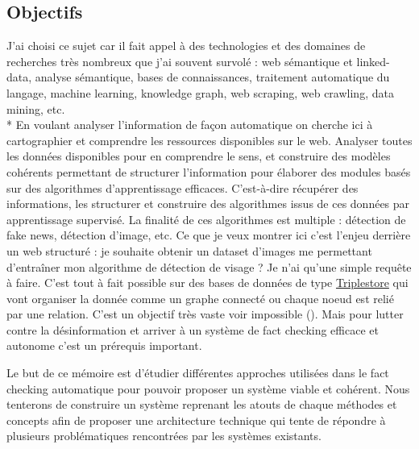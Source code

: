 \subsection{Objectifs}


J'ai choisi ce sujet car il fait appel à des technologies et des domaines de recherches très nombreux que j'ai souvent survolé : web sémantique et linked-data, analyse sémantique, bases de connaissances, traitement automatique du langage, machine learning, knowledge graph, web scraping, web crawling, data mining, etc. 
\\*
En voulant analyser l'information de façon automatique on cherche ici à cartographier et comprendre les ressources disponibles sur le web. Analyser toutes les données disponibles pour en comprendre le sens, et construire des modèles cohérents permettant de structurer l'information pour élaborer des modules basés sur des algorithmes d'apprentissage efficaces. C'est-à-dire récupérer des informations, les structurer et construire des algorithmes issus de ces données par apprentissage supervisé. La finalité de ces algorithmes est multiple : détection de fake news, détection d'image, etc. Ce que je veux montrer ici c'est l'enjeu derrière un web structuré : je souhaite obtenir un dataset d'images me permettant d'entraîner mon algorithme de détection de visage ? Je n'ai qu'une simple requête à faire. C'est tout à fait possible sur des bases de données de type \href{https://fr.wikipedia.org/wiki/Triplestore}{Triplestore} \cite{wiki:Triplestore} qui vont organiser la donnée comme un graphe connecté ou chaque noeud est relié par une relation. C'est un objectif très vaste voir impossible (). Mais pour lutter contre la désinformation et arriver à un système de fact checking efficace et autonome c'est un prérequis important.

Le but de ce mémoire est d'étudier différentes approches utilisées dans le fact checking automatique pour pouvoir proposer un système viable et cohérent. Nous tenterons de construire un système reprenant les atouts de chaque méthodes et concepts afin de proposer une architecture technique qui tente de répondre à plusieurs problématiques rencontrées par les systèmes existants.


